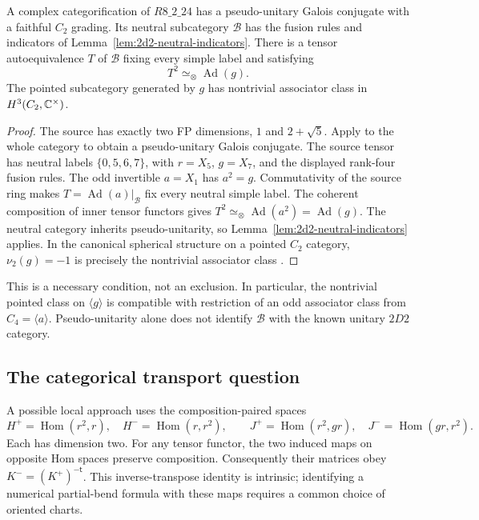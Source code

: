 \begin{proposition}\label{prop:r24-reduction}
A complex categorification of $R8\_2\_24$ has a pseudo-unitary Galois
conjugate with a faithful $C_2$ grading. Its neutral subcategory
$\mathcal B$ has the fusion rules and indicators of
Lemma~\ref{lem:2d2-neutral-indicators}. There is a tensor autoequivalence
$T$ of $\mathcal B$ fixing every simple label and satisfying
\[
 T^2\simeq_{\otimes}\operatorname{Ad}(g).
\]
The pointed subcategory generated by $g$ has nontrivial associator class
in $H^3(C_2,\mathbb C^\times)$.
\end{proposition}
\begin{proof}
The source has exactly two FP dimensions, $1$ and $2+\sqrt5$.
Apply \cite[Lemma~3.1]{SchNear} to the whole category to obtain a
pseudo-unitary Galois conjugate. The source tensor has neutral labels
$\{0,5,6,7\}$, with $r=X_5$, $g=X_7$, and the displayed rank-four
fusion rules. The odd invertible $a=X_1$ has $a^2=g$.
Commutativity of the source ring makes
$T=\operatorname{Ad}(a)|_{\mathcal B}$ fix every neutral simple label.
The coherent composition of inner tensor functors gives
$T^2\simeq_{\otimes}\operatorname{Ad}(a^2)=\operatorname{Ad}(g)$.
The neutral category inherits pseudo-unitarity, so
Lemma~\ref{lem:2d2-neutral-indicators} applies. In the canonical spherical
structure on a pointed $C_2$ category, $\nu_2(g)=-1$ is precisely the
nontrivial associator class \cite{NgIndicators}.
\end{proof}

This is a necessary condition, not an exclusion. In particular,
the nontrivial pointed class on $\langle g\rangle$ is compatible with
restriction of an odd associator class from $C_4=\langle a\rangle$.
Pseudo-unitarity alone does not identify $\mathcal B$ with the known
unitary $2D2$ category.

\subsection{The categorical transport question}
\label{sec:r24-transport}
A possible local approach uses the composition-paired spaces
\[
 H^+=\operatorname{Hom}(r^2,r),\quad
 H^-=\operatorname{Hom}(r,r^2),\qquad
 J^+=\operatorname{Hom}(r^2,gr),\quad
 J^-=\operatorname{Hom}(gr,r^2).
\]
Each has dimension two. For any tensor functor, the two induced
maps on opposite Hom spaces preserve composition. Consequently their
matrices obey $K^-=(K^+)^{-\mathsf t}$. This inverse-transpose identity
is intrinsic; identifying a numerical partial-bend formula with these
maps requires a common choice of oriented charts.


